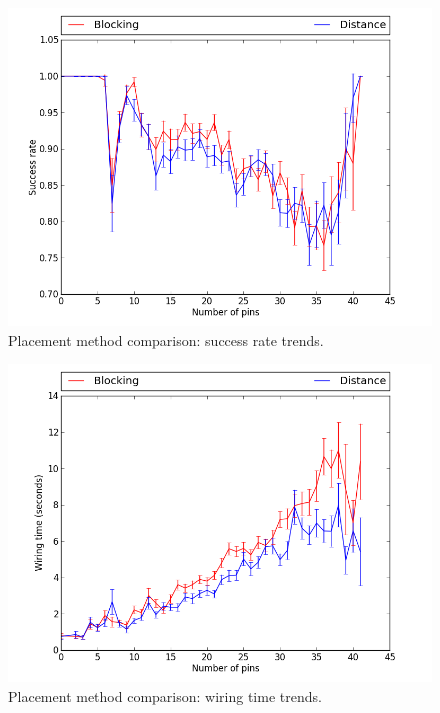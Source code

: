 \begin{figure}[H]
\begin{center}
\includegraphics[width=\textwidth]{Images/placement_success_trend_comparison.png}
\caption{Placement method comparison: success rate trends.}
\label{fig:placement_success_trend}
\end{center}
\end{figure}

\begin{figure}[H]
\begin{center}
\includegraphics[width=\textwidth]{Images/placement_time_trend_comparison.png}
\caption{Placement method comparison: wiring time trends.}
\label{fig:placement_time_trend}
\end{center}
\end{figure}

